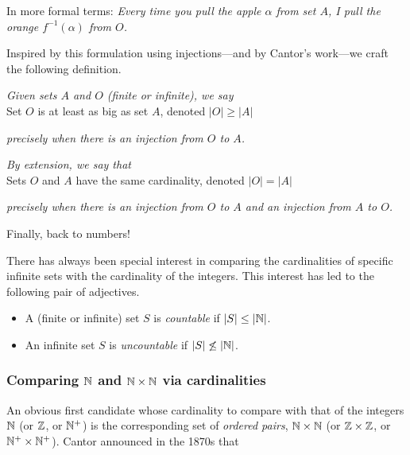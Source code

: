 \noindent
In more formal terms: {\em Every time you pull the apple $\alpha$ from set $A$, I pull the orange $f^{-1}(\alpha)$ from $O$.}

\medskip

Inspired by this formulation using injections---and by Cantor's work---we craft the following definition.

\bigskip

\noindent
{\em Given sets $A$ and $O$ (finite or infinite), we say} \\
\hspace*{.35in} Set $O$ is at least as big as set $A$, denoted $|O| \geq |A|$

\noindent
{\em precisely when there is an injection from $O$ to $A$.}

\medskip

\noindent
{\em By extension, we say that} \\
\hspace*{.35in}Sets $O$ and $A$ have the same cardinality, denoted $|O| = |A|$

\noindent
{\em precisely when there is an injection from $O$ to $A$ {\em and} an injection from $A$ to $O$.}

\bigskip

Finally, back to numbers!

\smallskip

There has always been special interest in comparing the cardinalities of specific infinite sets with the cardinality of the integers.  This interest has led to the following pair of adjectives.

  
 
\begin{itemize}
\item
A (finite or infinite) set $S$ is {\it countable} if $|S| \leq |\mathbb{N}|$.

\medskip\item
An infinite set $S$ is {\it uncountable} if $|S| \not\leq |\mathbb{N}|$.
\end{itemize}

\subsubsection{Comparing $\mathbb{N}$ and $\mathbb{N} \times \mathbb{N}$ via cardinalities}
\label{sec:compare-NxN-N-via-card}

An obvious first candidate whose cardinality to compare with that of the integers $\mathbb{N}$ (or $\mathbb{Z}$, or $\mathbb{N}^+$) is the corresponding set of {\em ordered pairs}, $\mathbb{N} \times \mathbb{N}$ (or $\mathbb{Z} \times \mathbb{Z}$, or $\mathbb{N}^+ \times \mathbb{N}^+$).  Cantor announced in the 1870s that \\
\hspace*{.35in}{\em Pairing does not increase cardinality in infinite sets.}

